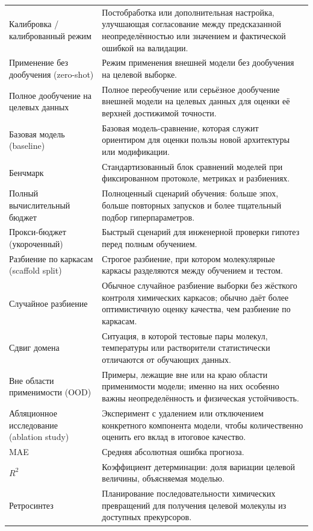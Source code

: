 \documentclass[11pt]{article}
\begin{document}
\begin{longtable}{p{}p{}}
Калибровка / калиброванный режим & Постобработка или дополнительная настройка, улучшающая согласование между предсказанной неопределённостью или значением и фактической ошибкой на валидации. \\
Применение без дообучения (zero-shot) & Режим применения внешней модели без дообучения на целевой выборке. \\
Полное дообучение на целевых данных & Полное переобучение или серьёзное дообучение внешней модели на целевых данных для оценки её верхней достижимой точности. \\
Базовая модель (baseline) & Базовая модель-сравнение, которая служит ориентиром для оценки пользы новой архитектуры или модификации. \\
Бенчмарк & Стандартизованный блок сравнений моделей при фиксированном протоколе, метриках и разбиениях. \\
Полный вычислительный бюджет & Полноценный сценарий обучения: больше эпох, больше повторных запусков и более тщательный подбор гиперпараметров. \\
Прокси-бюджет (укороченный) & Быстрый сценарий для инженерной проверки гипотез перед полным обучением. \\
Разбиение по каркасам (scaffold split) & Строгое разбиение, при котором молекулярные каркасы разделяются между обучением и тестом. \\
Случайное разбиение & Обычное случайное разбиение выборки без жёсткого контроля химических каркасов; обычно даёт более оптимистичную оценку качества, чем разбиение по каркасам. \\
Сдвиг домена & Ситуация, в которой тестовые пары молекул, температуры или растворители статистически отличаются от обучающих данных. \\
Вне области применимости (OOD) & Примеры, лежащие вне или на краю области применимости модели; именно на них особенно важны неопределённость и физическая устойчивость. \\
Абляционное исследование (ablation study) & Эксперимент с удалением или отключением конкретного компонента модели, чтобы количественно оценить его вклад в итоговое качество. \\
MAE & Средняя абсолютная ошибка прогноза. \\
$R^2$ & Коэффициент детерминации: доля вариации целевой величины, объясняемая моделью. \\
Ретросинтез & Планирование последовательности химических превращений для получения целевой молекулы из доступных прекурсоров. \\

\end{longtable}
\end{document}
